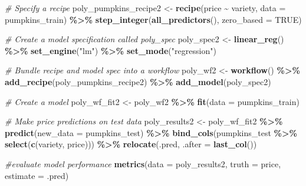 \documentclass[
]{article}
\newenvironment{Shaded}{\begin{snugshade}}{\end{snugshade}}
\newcommand{\AttributeTok}[1]{\textcolor[rgb]{0.13,0.29,0.53}{#1}}
\newcommand{\CommentTok}[1]{\textcolor[rgb]{0.56,0.35,0.01}{\textit{#1}}}
\newcommand{\ConstantTok}[1]{\textcolor[rgb]{0.56,0.35,0.01}{#1}}
\newcommand{\FunctionTok}[1]{\textcolor[rgb]{0.13,0.29,0.53}{\textbf{#1}}}
\newcommand{\NormalTok}[1]{#1}
\newcommand{\OtherTok}[1]{\textcolor[rgb]{0.56,0.35,0.01}{#1}}
\newcommand{\SpecialCharTok}[1]{\textcolor[rgb]{0.81,0.36,0.00}{\textbf{#1}}}
\newcommand{\StringTok}[1]{\textcolor[rgb]{0.31,0.60,0.02}{#1}}
\begin{document}
\begin{Shaded}
\begin{Highlighting}[]
\CommentTok{\# Specify a recipe}
\NormalTok{poly\_pumpkins\_recipe2 }\OtherTok{\textless{}{-}}
  \FunctionTok{recipe}\NormalTok{(price }\SpecialCharTok{\textasciitilde{}}\NormalTok{ variety, }\AttributeTok{data =}\NormalTok{ pumpkins\_train) }\SpecialCharTok{\%\textgreater{}\%}
  \FunctionTok{step\_integer}\NormalTok{(}\FunctionTok{all\_predictors}\NormalTok{(), }\AttributeTok{zero\_based =} \ConstantTok{TRUE}\NormalTok{) }

\CommentTok{\# Create a model specification called poly\_spec}
\NormalTok{poly\_spec2 }\OtherTok{\textless{}{-}} \FunctionTok{linear\_reg}\NormalTok{() }\SpecialCharTok{\%\textgreater{}\%} 
  \FunctionTok{set\_engine}\NormalTok{(}\StringTok{"lm"}\NormalTok{) }\SpecialCharTok{\%\textgreater{}\%} 
  \FunctionTok{set\_mode}\NormalTok{(}\StringTok{"regression"}\NormalTok{)}



\CommentTok{\# Bundle recipe and model spec into a workflow}
\NormalTok{poly\_wf2 }\OtherTok{\textless{}{-}} \FunctionTok{workflow}\NormalTok{() }\SpecialCharTok{\%\textgreater{}\%} 
  \FunctionTok{add\_recipe}\NormalTok{(poly\_pumpkins\_recipe2) }\SpecialCharTok{\%\textgreater{}\%} 
  \FunctionTok{add\_model}\NormalTok{(poly\_spec2)}

\CommentTok{\# Create a model}
\NormalTok{poly\_wf\_fit2 }\OtherTok{\textless{}{-}}\NormalTok{ poly\_wf2 }\SpecialCharTok{\%\textgreater{}\%} 
  \FunctionTok{fit}\NormalTok{(}\AttributeTok{data =}\NormalTok{ pumpkins\_train)}


\CommentTok{\# Make price predictions on test data}
\NormalTok{poly\_results2 }\OtherTok{\textless{}{-}}\NormalTok{ poly\_wf\_fit2 }\SpecialCharTok{\%\textgreater{}\%} \FunctionTok{predict}\NormalTok{(}\AttributeTok{new\_data =}\NormalTok{ pumpkins\_test) }\SpecialCharTok{\%\textgreater{}\%} 
  \FunctionTok{bind\_cols}\NormalTok{(pumpkins\_test }\SpecialCharTok{\%\textgreater{}\%} \FunctionTok{select}\NormalTok{(}\FunctionTok{c}\NormalTok{(variety, price))) }\SpecialCharTok{\%\textgreater{}\%} 
  \FunctionTok{relocate}\NormalTok{(.pred, }\AttributeTok{.after =} \FunctionTok{last\_col}\NormalTok{())}




\CommentTok{\#evaluate model performance}
\FunctionTok{metrics}\NormalTok{(}\AttributeTok{data =}\NormalTok{ poly\_results2, }\AttributeTok{truth =}\NormalTok{ price, }\AttributeTok{estimate =}\NormalTok{ .pred)}
\end{Highlighting}
\end{Shaded}
\end{document}
